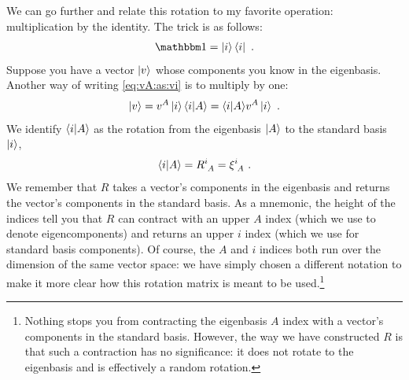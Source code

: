 \documentclass[12pt]{article}
\begin{document}
We can go further and relate this rotation to my favorite operation: multiplication by the identity. The trick is as follows:
\begin{align}
    \one = \ket{i}\bra{i} \ .
\end{align}
Suppose you have a vector $\left|v\right\rangle$ whose components you know in the eigenbasis. Another way of writing \eqref{eq:vA:as:vi} is to multiply by one:
\begin{align}
    \left|v\right\rangle = v^A \left|i\right\rangle\langle i | A\rangle = \langle i | A\rangle v^A \left|i\right\rangle \ .
\end{align}
We identify $\langle i | A \rangle$ as the rotation from the eigenbasis $\left|A\right\rangle$ to the standard basis $\left|i\right\rangle$, 
\begin{align}
    \la i | A \ra = R\aij{i}{A} = \xi\aij{i}{A} \ .
\end{align}
We remember that $R$ takes a vector's components in the eigenbasis and returns the vector's components in the standard basis. As a mnemonic, the height of the indices tell you that $R$ can contract with an upper $A$ index (which we use to denote eigencomponents) and returns an upper $i$ index (which we use for standard basis components). Of course, the $A$ and $i$ indices both run over the dimension of the same vector space: we have simply chosen a different notation to make it more clear how this rotation matrix is meant to be used.\footnote{Nothing stops you from contracting the eigenbasis $A$ index with a vector's components in the standard basis. However, the way we have constructed $R$ is that such a contraction has no significance: it does not rotate to the eigenbasis and is effectively a random rotation. }
\end{document}
